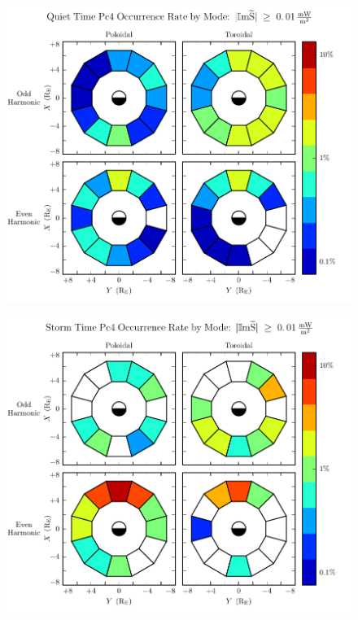 \begin{figure}[!htb]
    \centering
    \includegraphics[width=\textwidth]{figures/mode_calm.pdf}
    \caption[Pc4 Rate by Mode: Dst $\geq \SI{-30}{\nT}$]{
      \todo{$\cdots$}
    }
    \label{fig_mode_calm}
\end{figure}

\begin{figure}[!htb]
    \centering
    \includegraphics[width=\textwidth]{figures/mode_storm.pdf}
    \caption[Pc4 Rate by Mode: Dst $< \SI{-30}{\nT}$]{
      \todo{$\cdots$}
    }
    \label{fig_mode_storm}
\end{figure}





